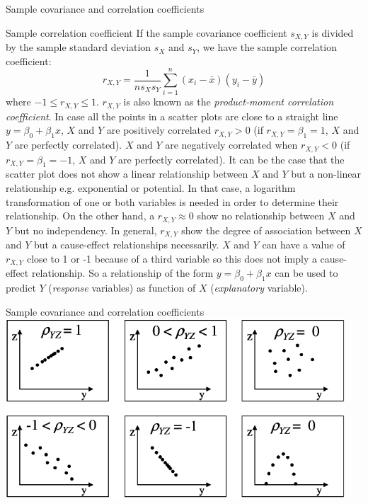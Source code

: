 \documentclass[8pt]{beamer}
\begin{document}
\begin{frame}{Sample covariance and correlation coefficients}
    \begin{block}{Sample correlation coefficient}
        If the sample covariance coefficient $s_{X,Y}$ is divided by the sample standard deviation $s_X$ and $s_Y$, we have the sample correlation coefficient:
        $$
        r_{X,Y} = \frac{1}{n s_X s_Y} \sum_{i=1}^{n} \left(x_i - \bar{x}\right)\left(y_i - \bar{y}\right)
        $$
    where $-1 \le r_{X,Y} \le 1$. $r_{X,Y}$ is also known as the \emph{product-moment correlation coefficient}. In case all the points in a scatter plots are close to a straight line $y = \beta_0 + \beta_1 x$, $X$ and $Y$ are positively correlated $r_{X,Y} > 0$ (if $r_{X,Y}=\beta_1 = 1$, $X$ and $Y$ are perfectly correlated). $X$ and $Y$ are negatively correlated when $r_{X,Y} < 0$ (if $r_{X,Y}=\beta_1 =-1$, $X$ and $Y$ are perfectly correlated). It can be the case that the scatter plot does not show a linear relationship between $X$ and $Y$ but a non-linear relationship e.g. exponential or potential. In that case, a logarithm transformation of one or both variables is needed in order to determine their relationship. On the other hand, a $r_{X,Y} \approx 0$ show no relationship between $X$ and $Y$ but no independency. In general, $r_{X,Y}$ show the degree of association between $X$ and $Y$ but a cause-effect relationships necessarily. $X$ and $Y$ can have a value of $r_{X,Y}$ close to 1 or -1 because of a third variable so this does not imply a cause-effect relationship. So a relationship of the form $y = \beta_0 + \beta_1 x$ can be used to predict $Y$ (\emph{response} variables) as function of $X$ (\emph{explanatory} variable).
   \end{block}

\end{frame}

\begin{frame}{Sample covariance and correlation coefficients}
        \includegraphics[width=0.95\textwidth]{fiBi213.png}
        \vspace{-0.1cm}
\end{frame}
\end{document}

